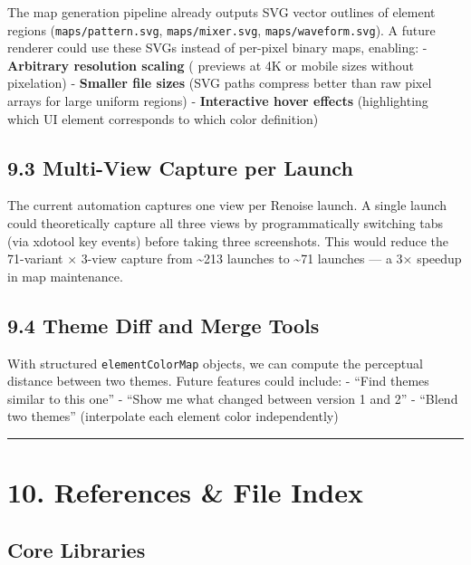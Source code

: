 \documentclass[
  11pt,
  oneside]{report}
\begin{document}
The map generation pipeline already outputs SVG vector outlines of
element regions (\texttt{maps/pattern.svg}, \texttt{maps/mixer.svg},
\texttt{maps/waveform.svg}). A future renderer could use these SVGs
instead of per-pixel binary maps, enabling: - \textbf{Arbitrary
resolution scaling} ( previews at 4K or mobile sizes without pixelation)
- \textbf{Smaller file sizes} (SVG paths compress better than raw pixel
arrays for large uniform regions) - \textbf{Interactive hover effects}
(highlighting which UI element corresponds to which color definition)

\subsection{9.3 Multi-View Capture per
Launch}\label{multi-view-capture-per-launch}

The current automation captures one view per Renoise launch. A single
launch could theoretically capture all three views by programmatically
switching tabs (via xdotool key events) before taking three screenshots.
This would reduce the 71-variant × 3-view capture from
\textasciitilde213 launches to \textasciitilde71 launches --- a 3×
speedup in map maintenance.

\subsection{9.4 Theme Diff and Merge
Tools}\label{theme-diff-and-merge-tools}

With structured \texttt{elementColorMap} objects, we can compute the
perceptual distance between two themes. Future features could include: -
``Find themes similar to this one'' - ``Show me what changed between
version 1 and 2'' - ``Blend two themes'' (interpolate each element color
independently)

\begin{center}\rule{0.5\linewidth}{0.5pt}\end{center}

\section{10. References \& File Index}\label{references-file-index}

\subsection{Core Libraries}\label{core-libraries}
\end{document}
